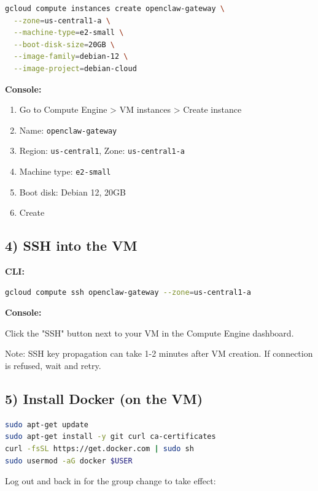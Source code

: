 \begin{lstlisting}[language=bash]
gcloud compute instances create openclaw-gateway \
  --zone=us-central1-a \
  --machine-type=e2-small \
  --boot-disk-size=20GB \
  --image-family=debian-12 \
  --image-project=debian-cloud
\end{lstlisting}


\textbf{Console:}

\begin{enumerate}
  \item Go to Compute Engine > VM instances > Create instance
  \item Name: \texttt{openclaw-gateway}
  \item Region: \texttt{us-central1}, Zone: \texttt{us-central1-a}
  \item Machine type: \texttt{e2-small}
  \item Boot disk: Debian 12, 20GB
  \item Create
\end{enumerate}


\hrulefill


\subsection{4) SSH into the VM}


\textbf{CLI:}

\begin{lstlisting}[language=bash]
gcloud compute ssh openclaw-gateway --zone=us-central1-a
\end{lstlisting}


\textbf{Console:}

Click the "SSH" button next to your VM in the Compute Engine dashboard.

Note: SSH key propagation can take 1-2 minutes after VM creation. If connection is refused, wait and retry.

\hrulefill


\subsection{5) Install Docker (on the VM)}


\begin{lstlisting}[language=bash]
sudo apt-get update
sudo apt-get install -y git curl ca-certificates
curl -fsSL https://get.docker.com | sudo sh
sudo usermod -aG docker $USER
\end{lstlisting}


Log out and back in for the group change to take effect:

